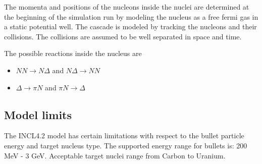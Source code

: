 The momenta and positions of the nucleons inside the nuclei are
determined at the beginning of the simulation run by modeling the
nucleus as a free fermi gas in a static potential well. The cascade is
modeled by tracking the nucleons and their collisions. The collisions
are assumed to be well separated in space and time.

The possible reactions inside the nucleus are 
\begin{itemize}
\item $NN \rightarrow N \Delta$ and $N \Delta \rightarrow NN$ 
\item $\Delta \rightarrow \pi N$ and $\pi N \rightarrow \Delta$
\end{itemize}


\subsection{Model limits}



The INCL4.2 model has certain limitations with respect to the bullet
particle energy and target nucleus type. The supported energy range
for bullets is: 200 MeV - 3 GeV. Acceptable target nuclei range from
Carbon to Uranium.




